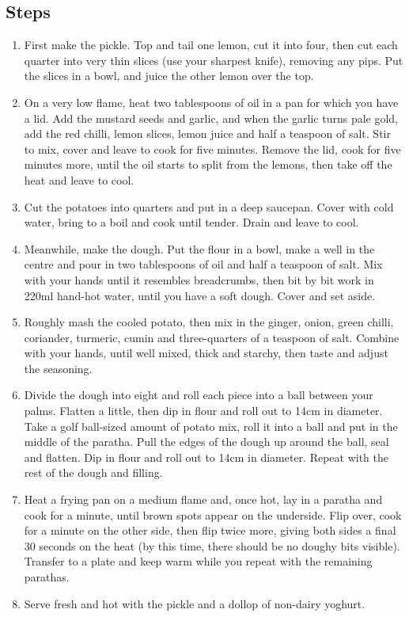 \documentclass{book}
\begin{document}
\subsection*{Steps}
\begin{enumerate}
\item First make the pickle. Top and tail one lemon, cut it into four, then cut each quarter into very thin slices (use your sharpest knife), removing any pips. Put the slices in a bowl, and juice the other lemon over the top.
\item On a very low flame, heat two tablespoons of oil in a pan for which you have a lid. Add the mustard seeds and garlic, and when the garlic turns pale gold, add the red chilli, lemon slices, lemon juice and half a teaspoon of salt. Stir to mix, cover and leave to cook for five minutes. Remove the lid, cook for five minutes more, until the oil starts to split from the lemons, then take off the heat and leave to cool.
\item Cut the potatoes into quarters and put in a deep saucepan. Cover with cold water, bring to a boil and cook until tender. Drain and leave to cool.
\item Meanwhile, make the dough. Put the flour in a bowl, make a well in the centre and pour in two tablespoons of oil and half a teaspoon of salt. Mix with your hands until it resembles breadcrumbs, then bit by bit work in 220ml hand-hot water, until you have a soft dough. Cover and set aside.
\item Roughly mash the cooled potato, then mix in the ginger, onion, green chilli, coriander, turmeric, cumin and three-quarters of a teaspoon of salt. Combine with your hands, until well mixed, thick and starchy, then taste and adjust the seasoning.
\item Divide the dough into eight and roll each piece into a ball between your palms. Flatten a little, then dip in flour and roll out to 14cm in diameter. Take a golf ball-sized amount of potato mix, roll it into a ball and put in the middle of the paratha. Pull the edges of the dough up around the ball, seal and flatten. Dip in flour and roll out to 14cm in diameter. Repeat with the rest of the dough and filling.
\item Heat a frying pan on a medium flame and, once hot, lay in a paratha and cook for a minute, until brown spots appear on the underside. Flip over, cook for a minute on the other side, then flip twice more, giving both sides a final 30 seconds on the heat (by this time, there should be no doughy bits visible). Transfer to a plate and keep warm while you repeat with the remaining parathas.
\item Serve fresh and hot with the pickle and a dollop of non-dairy yoghurt. 
\end{enumerate}
\newpage
\end{document}

